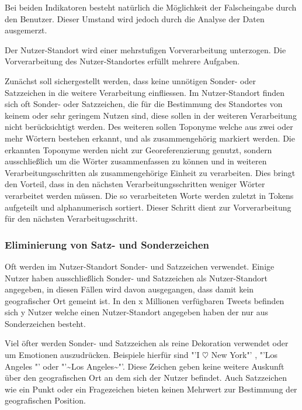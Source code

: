 		Bei beiden Indikatoren besteht natürlich die Möglichkeit der Falscheingabe durch den Benutzer. Dieser Umstand wird jedoch durch die Analyse der Daten ausgemerzt.  


		Der Nutzer-Standort wird einer mehrstufigen Vorverarbeitung unterzogen.
		Die Vorverarbeitung des Nutzer-Standortes erfüllt mehrere Aufgaben. 

		Zunächst soll sichergestellt werden, dass keine unnötigen Sonder- oder Satzzeichen in die weitere Verarbeitung einfliessen. 
		Im Nutzer-Standort finden sich oft Sonder- oder Satzzeichen, die für die Bestimmung des Standortes von keinem oder sehr geringem Nutzen sind, diese sollen in der weiteren Verarbeitung nicht berücksichtigt werden.
	  	Des weiteren sollen Toponyme welche aus zwei oder mehr Wörtern bestehen  erkannt, und als zusammengehörig markiert werden.
	  	Die erkannten Toponyme werden nicht zur Georeferenzierung genutzt, sondern ausschließlich um die Wörter zusammenfassen zu können und in weiteren Verarbeitungsschritten als zusammengehörige Einheit zu verarbeiten.
	  	Dies bringt den Vorteil, dass in den nächsten Verarbeitungsschritten weniger Wörter verarbeitet werden müssen.
	  	Die so verarbeiteten Worte werden zuletzt in Tokens aufgeteilt und alphanumerisch sortiert. 
	  	Dieser Schritt dient zur Vorverarbeitung für den nächsten Verarbeitugsschritt.

		  	\subsubsection{Eliminierung von Satz- und Sonderzeichen}
		  	Oft werden im Nutzer-Standort Sonder- und Satzzeichen verwendet. 
			Einige Nutzer haben ausschließlich Sonder- und Satzzeichen als Nutzer-Standort angegeben, in diesen Fällen wird davon ausgegangen, dass damit kein geografischer Ort gemeint ist. 
			In den x Millionen verfügbaren Tweets befinden sich y Nutzer welche einen Nutzer-Standort angegeben haben der nur aus Sonderzeichen besteht. 

			Viel öfter werden Sonder- und Satzzeichen als reine Dekoration verwendet oder um Emotionen auszudrücken. 
			Beispiele hierfür sind "'I $\heartsuit$ New York"' , "'\Smiley Los Angeles \Smiley"' oder "'\dagger\textasciitilde Los Angeles\textasciitilde\dagger"'.
			Diese Zeichen geben keine weitere Auskunft über den geografischen Ort an dem sich der Nutzer befindet. 
			Auch Satzzeichen wie ein Punkt oder ein Fragezeichen bieten keinen Mehrwert zur Bestimmung der geografischen Position. 



